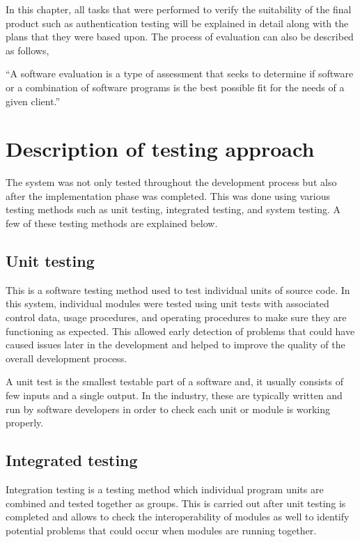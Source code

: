 \documentclass[12pt]{report}
\begin{document}
In this chapter, all tasks that were performed to verify the suitability of the final product such as authentication testing will be explained in detail along with the plans that they were based upon. The process of evaluation can also be described as follows,

``A software evaluation is a type of assessment that seeks to determine if software or a combination of software programs is the best possible fit for the needs of a given client.''\cite{tatum_2020_software_evaluation}


\section{Description of testing approach}
The system was not only tested throughout the development process but also after the implementation phase was completed. This was done using various testing methods such as unit testing, integrated testing, and system testing.
A few of these testing methods are explained below.

\subsection{Unit testing}
This is a software testing method used to test individual units of source code. In this system, individual modules were tested using unit tests with associated control data, usage procedures, and operating procedures to make sure they are functioning as expected. This allowed early detection of problems that could have caused issues later in the development and helped to improve the quality of the overall development process.

A unit test is the smallest testable part of a software and, it usually consists of few inputs and a single output. In the industry, these are typically written and run by software developers in order to check each unit or module is working properly.

\subsection{Integrated testing}
Integration testing is a testing method which individual program units are combined and tested together as groups. This is carried out after unit testing is completed and allows to check the interoperability of modules as well to identify potential problems that could occur when modules are running together.
\end{document}
